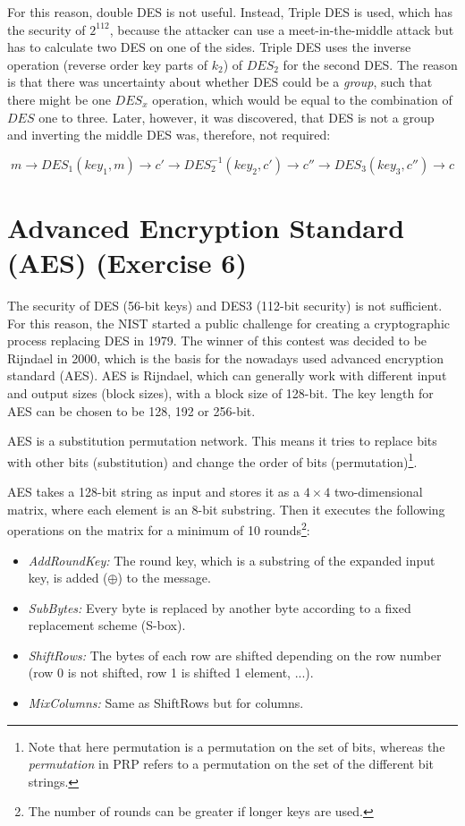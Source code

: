 For this reason, double DES is not useful. Instead, Triple DES is used, which has the security of $2^{112}$, because the attacker can use a meet-in-the-middle attack but has to calculate two DES on one of the sides. Triple DES uses the inverse operation (reverse order key parts of $k_2$) of $DES_2$ for the second DES. The reason is that there was uncertainty about whether DES could be a \textit{group}, such that there might be one $DES_{x}$ operation, which would be equal to the combination of $DES$ one to three. Later, however, it was discovered, that DES is not a group and inverting the middle DES was, therefore, not required:

$$
    m \rightarrow DES_{1}(key_1, m) \rightarrow c' \rightarrow DES^{-1}_{2}(key_2, c') \rightarrow c'' \rightarrow DES_{3}(key_3, c'') \rightarrow c
$$

\section{Advanced Encryption Standard (AES) (Exercise 6)}

The security of DES (56-bit keys) and DES3 (112-bit security) is not sufficient. For this reason, the NIST started a public challenge for creating a cryptographic process replacing DES in 1979. The winner of this contest was decided to be Rijndael in 2000, which is the basis for the nowadays used advanced encryption standard (AES). AES is Rijndael, which can generally work with different input and output sizes (block sizes), with a block size of 128-bit. The key length for AES can be chosen to be 128, 192 or 256-bit.

AES is a substitution permutation network. This means it tries to replace bits with other bits (substitution) and change the order of bits (permutation)\footnote{Note that here permutation is a permutation on the set of bits, whereas the \textit{permutation} in PRP refers to a permutation on the set of the different bit strings.}.

AES takes a 128-bit string as input and stores it as a $4 \times 4$ two-dimensional matrix, where each element is an 8-bit substring. Then it executes the following operations on the matrix for a minimum of 10 rounds\footnote{The number of rounds can be greater if longer keys are used.}:

\begin{itemize}
    \item \textit{AddRoundKey:} The round key, which is a substring of the expanded input key, is added ($\oplus$) to the message.
    \item \textit{SubBytes:} Every byte is replaced by another byte according to a fixed replacement scheme (S-box).
    \item \textit{ShiftRows:} The bytes of each row are shifted depending on the row number (row 0 is not shifted, row 1 is shifted 1 element, ...).
    \item \textit{MixColumns:} Same as ShiftRows but for columns.
\end{itemize}

